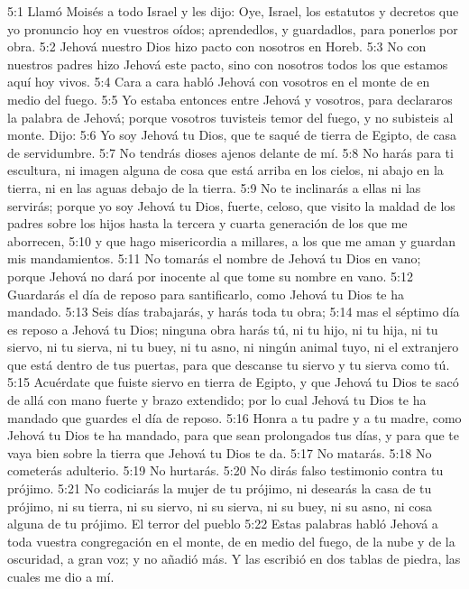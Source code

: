 5:1 Llamó Moisés a todo Israel y les dijo: Oye, Israel, los estatutos y decretos que yo pronuncio hoy en vuestros oídos; aprendedlos, y guardadlos, para ponerlos por obra.  
5:2 Jehová nuestro Dios hizo pacto con nosotros en Horeb.  
5:3 No con nuestros padres hizo Jehová este pacto, sino con nosotros todos los que estamos aquí hoy vivos.  
5:4 Cara a cara habló Jehová con vosotros en el monte de en medio del fuego.  
5:5 Yo estaba entonces entre Jehová y vosotros, para declararos la palabra de Jehová; porque vosotros tuvisteis temor del fuego, y no subisteis al monte. Dijo:  
5:6 Yo soy Jehová tu Dios, que te saqué de tierra de Egipto, de casa de servidumbre.  
5:7 No tendrás dioses ajenos delante de mí.  
5:8 No harás para ti escultura, ni imagen alguna de cosa que está arriba en los cielos, ni abajo en la tierra, ni en las aguas debajo de la tierra.  
5:9 No te inclinarás a ellas ni las servirás; porque yo soy Jehová tu Dios, fuerte, celoso, que visito la maldad de los padres sobre los hijos hasta la tercera y cuarta generación de los que me aborrecen,  
5:10 y que hago misericordia a millares, a los que me aman y guardan mis mandamientos.  
5:11 No tomarás el nombre de Jehová tu Dios en vano; porque Jehová no dará por inocente al que tome su nombre en vano.  
5:12 Guardarás el día de reposo para santificarlo, como Jehová tu Dios te ha mandado. 
5:13 Seis días trabajarás, y harás toda tu obra;  
5:14 mas el séptimo día es reposo a Jehová tu Dios; ninguna obra harás tú, ni tu hijo, ni tu hija, ni tu siervo, ni tu sierva, ni tu buey, ni tu asno, ni ningún animal tuyo, ni el extranjero que está dentro de tus puertas, para que descanse tu siervo y tu sierva como tú.  
5:15 Acuérdate que fuiste siervo en tierra de Egipto, y que Jehová tu Dios te sacó de allá con mano fuerte y brazo extendido; por lo cual Jehová tu Dios te ha mandado que guardes el día de reposo.  
5:16 Honra a tu padre y a tu madre, como Jehová tu Dios te ha mandado, para que sean prolongados tus días, y para que te vaya bien sobre la tierra que Jehová tu Dios te da.  
5:17 No matarás. 
5:18 No cometerás adulterio.  
5:19 No hurtarás. 
5:20 No dirás falso testimonio contra tu prójimo.  
5:21 No codiciarás la mujer de tu prójimo, ni desearás la casa de tu prójimo, ni su tierra, ni su siervo, ni su sierva, ni su buey, ni su asno, ni cosa alguna de tu prójimo.  
El terror del pueblo   
5:22 Estas palabras habló Jehová a toda vuestra congregación en el monte, de en medio del fuego, de la nube y de la oscuridad, a gran voz; y no añadió más. Y las escribió en dos tablas de piedra, las cuales me dio a mí.  
